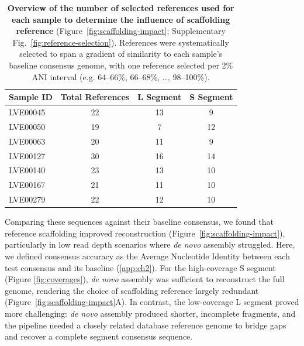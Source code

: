 \begin{table}[htbp]
    \centering
    \caption[Overview of the number of selected references used for each sample to determine the influence of scaffolding reference]{\textbf{Overview of the number of selected references used for each sample to determine the influence of scaffolding reference} (Figure~\ref{fig:scaffolding-impact}; Supplementary Fig.~\ref{fig:reference-selection}). References were systematically selected to span a gradient of similarity to each sample's baseline consensus genome, with one reference selected per 2\% ANI interval (e.g. 64--66\%, 66--68\%, \ldots, 98--100\%).}
    \label{table:n_references}
    \begin{tabular}{lccc}
        \toprule
        \textbf{Sample ID} & \textbf{Total References} & \textbf{L Segment} & \textbf{S Segment} \\
        \midrule
        LVE00045 & 22 & 13 & 9 \\
        LVE00050 & 19 & 7 & 12 \\
        LVE00063 & 20 & 11 & 9 \\
        LVE00127 & 30 & 16 & 14 \\
        LVE00140 & 23 & 13 & 10 \\
        LVE00167 & 21 & 11 & 10 \\
        LVE00279 & 22 & 12 & 10 \\
        \bottomrule
    \end{tabular}
\end{table}

Comparing these sequences against their baseline consensus, we found that reference scaffolding improved reconstruction (Figure~\ref{fig:scaffolding-impact}), particularly in low read depth scenarios where \textit{de novo} assembly struggled. Here, we defined consensus accuracy as the Average Nucleotide Identity between each test consensus and its baseline (\autoref{app:ch2}). For the high-coverage S segment (Figure \ref{fig:coverages}), \textit{de novo} assembly was sufficient to reconstruct the full genome, rendering the choice of scaffolding reference largely redundant (Figure~\ref{fig:scaffolding-impact}A). In contrast, the low-coverage L segment proved more challenging: \textit{de novo} assembly produced shorter, incomplete fragments, and the pipeline needed a closely related database reference genome to bridge gaps and recover a complete segment consensus sequence.

